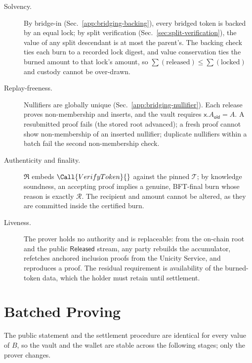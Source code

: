 \begin{description}
\item[Solvency.] By bridge-in (Sec.~\ref{app:bridging-backing}), every bridged token is backed by an equal lock; by split verification (Sec.~\ref{sec:split-verification}), the value of any split descendant is at most the parent's. The backing check ties each burn to a recorded lock digest, and value conservation ties the burned amount to that lock's amount, so $\sum(\text{released}) \le \sum(\text{locked})$ and custody cannot be over-drawn.
\item[Replay-freeness.] Nullifiers are globally unique (Sec.~\ref{app:bridging-nullifier}). Each release proves non-membership and inserts, and the vault requires $\mathsf{x}.A_\mathsf{old} = A$. A resubmitted proof fails (the stored root advanced); a fresh proof cannot show non-membership of an inserted nullifier; duplicate nullifiers within a batch fail the second non-membership check.
\item[Authenticity and finality.] $\mathfrak{R}$ embeds $\Call{VerifyToken}{}$ against the pinned $\mathcal{T}$; by knowledge soundness, an accepting proof implies a genuine, BFT-final burn whose reason is exactly $\mathcal{R}$. The recipient and amount cannot be altered, as they are committed inside the certified burn.
\item[Liveness.] The prover holds no authority and is replaceable: from the on-chain root and the public $\mathsf{Released}$ stream, any party rebuilds the accumulator, refetches anchored inclusion proofs from the Unicity Service, and reproduces a proof. The residual requirement is availability of the burned-token data, which the holder must retain until settlement.
\end{description}

\section{Batched Proving}\label{app:bridging-batching}

The public statement and the settlement procedure are identical for every value of $B$, so the vault and the wallet are stable across the following stages; only the prover changes.

